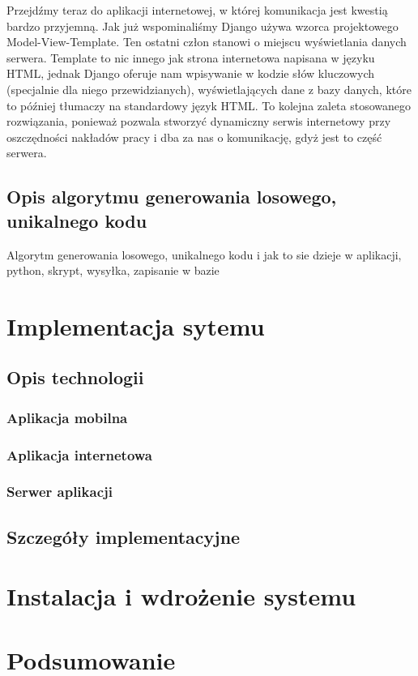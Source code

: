 \documentclass[12pt,titlepage]{article}
\begin{document}
Przejdźmy teraz do aplikacji internetowej, w której komunikacja jest kwestią bardzo przyjemną. Jak już wspominaliśmy Django używa wzorca projektowego Model-View-Template. 
Ten ostatni człon stanowi o miejscu wyświetlania danych serwera. Template to nic innego jak strona internetowa napisana w języku HTML, jednak Django oferuje nam wpisywanie 
w kodzie słów kluczowych (specjalnie dla niego przewidzianych), wyświetlających dane z bazy danych, które to później tłumaczy na standardowy język HTML. 
To kolejna zaleta stosowanego rozwiązania, ponieważ pozwala stworzyć dynamiczny serwis internetowy przy oszczędności nakładów pracy i dba za nas o komunikację, gdyż jest to część serwera.

\subsection{Opis algorytmu generowania losowego, unikalnego kodu}
Algorytm generowania losowego, unikalnego kodu i jak to sie dzieje w aplikacji, python, skrypt, wysyłka, zapisanie w bazie
\newpage
\section{Implementacja sytemu}

\subsection{Opis technologii}
\subsubsection{Aplikacja mobilna}
\subsubsection{Aplikacja internetowa}
\subsubsection{Serwer aplikacji}
\subsection{Szczegóły implementacyjne}

\newpage
\section{Instalacja i wdrożenie systemu}

\newpage
\section*{Podsumowanie}
\end{document}
